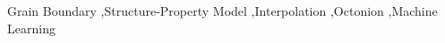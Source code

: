 \documentclass[final,twocolumn,12pt]{elsarticle}
\begin{document}
\begin{frontmatter}
		
		
		
		
		
		
		
		
		
		
		\begin{keyword}
			Grain Boundary \sep Structure-Property Model \sep Interpolation \sep Octonion \sep Machine Learning %
		\end{keyword}
		
	\end{frontmatter}
	
\end{document}
